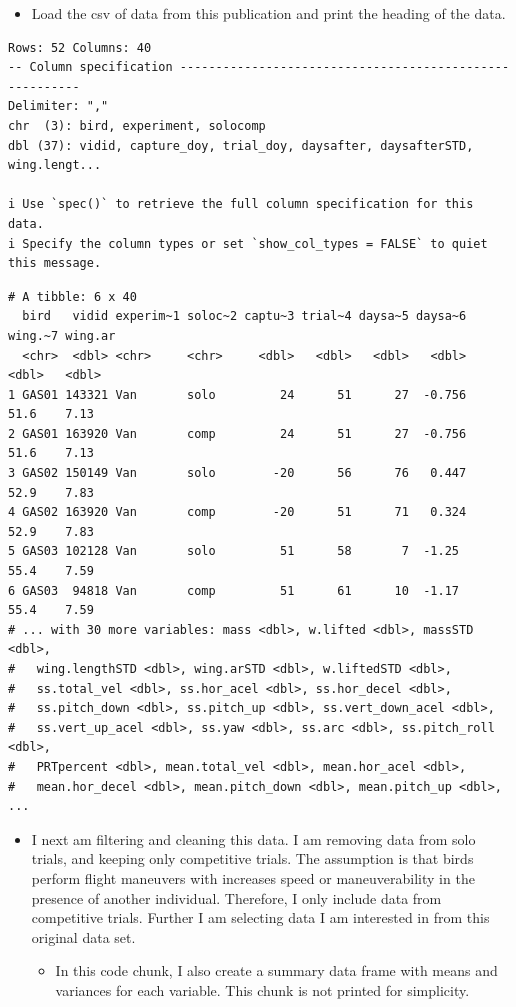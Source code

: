 \documentclass[
  letterpaper,
  DIV=11,
  numbers=noendperiod]{scrartcl}
\providecommand{\tightlist}{%
  \setlength{\itemsep}{0pt}\setlength{\parskip}{0pt}}\usepackage{longtable,booktabs,array}
\begin{document}
\begin{itemize}
\tightlist
\item
  Load the csv of data from this publication and print the heading of
  the data.
\end{itemize}

\begin{verbatim}
Rows: 52 Columns: 40
-- Column specification --------------------------------------------------------
Delimiter: ","
chr  (3): bird, experiment, solocomp
dbl (37): vidid, capture_doy, trial_doy, daysafter, daysafterSTD, wing.lengt...

i Use `spec()` to retrieve the full column specification for this data.
i Specify the column types or set `show_col_types = FALSE` to quiet this message.
\end{verbatim}

\begin{verbatim}
# A tibble: 6 x 40
  bird   vidid experim~1 soloc~2 captu~3 trial~4 daysa~5 daysa~6 wing.~7 wing.ar
  <chr>  <dbl> <chr>     <chr>     <dbl>   <dbl>   <dbl>   <dbl>   <dbl>   <dbl>
1 GAS01 143321 Van       solo         24      51      27  -0.756    51.6    7.13
2 GAS01 163920 Van       comp         24      51      27  -0.756    51.6    7.13
3 GAS02 150149 Van       solo        -20      56      76   0.447    52.9    7.83
4 GAS02 163920 Van       comp        -20      51      71   0.324    52.9    7.83
5 GAS03 102128 Van       solo         51      58       7  -1.25     55.4    7.59
6 GAS03  94818 Van       comp         51      61      10  -1.17     55.4    7.59
# ... with 30 more variables: mass <dbl>, w.lifted <dbl>, massSTD <dbl>,
#   wing.lengthSTD <dbl>, wing.arSTD <dbl>, w.liftedSTD <dbl>,
#   ss.total_vel <dbl>, ss.hor_acel <dbl>, ss.hor_decel <dbl>,
#   ss.pitch_down <dbl>, ss.pitch_up <dbl>, ss.vert_down_acel <dbl>,
#   ss.vert_up_acel <dbl>, ss.yaw <dbl>, ss.arc <dbl>, ss.pitch_roll <dbl>,
#   PRTpercent <dbl>, mean.total_vel <dbl>, mean.hor_acel <dbl>,
#   mean.hor_decel <dbl>, mean.pitch_down <dbl>, mean.pitch_up <dbl>, ...
\end{verbatim}

\begin{itemize}
\item
  I next am filtering and cleaning this data. I am removing data from
  solo trials, and keeping only competitive trials. The assumption is
  that birds perform flight maneuvers with increases speed or
  maneuverability in the presence of another individual. Therefore, I
  only include data from competitive trials. Further I am selecting data
  I am interested in from this original data set.

  \begin{itemize}
  \tightlist
  \item
    In this code chunk, I also create a summary data frame with means
    and variances for each variable. This chunk is not printed for
    simplicity.
  \end{itemize}
\end{itemize}
\end{document}
